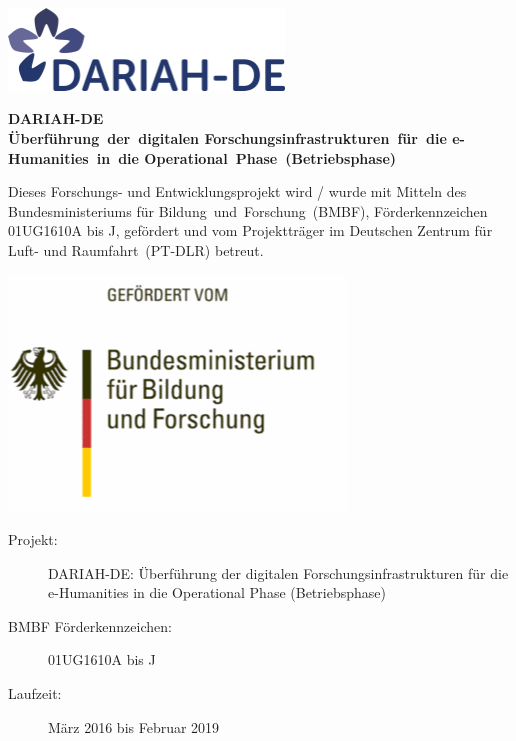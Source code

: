 \includegraphics[width=0.55\textwidth]{img/dariah-logo.png}
\vspace{20mm}
\maketitle
\vspace{5mm}
\begin{center}
\begin{LARGE}
\noindent\textbf{DARIAH-DE\\\vspace{3mm}Überführung~der~digitalen Forschungsinfrastrukturen~für~die e-Humanities~in~die Operational~Phase~(Betriebsphase)}
\end{LARGE}
\bigskip\bigskip
\vspace{10mm}

\begin{small}
\noindent Dieses Forschungs- und Entwicklungsprojekt wird / wurde mit Mitteln des Bundesministeriums für Bildung~und~Forschung~(BMBF), Förderkennzeichen 01UG1610A bis J, gefördert und vom Projektträger im Deutschen Zentrum für Luft- und Raumfahrt~(PT-DLR) betreut.\\
\end{small}
\vspace{20mm}
\includegraphics{img/bmbf.png}
\end{center}
\restoregeometry
\newpage
\normalsize
\begin{description}
\item[Projekt:] DARIAH-DE: Überführung der digitalen Forschungsinfrastrukturen für die\\e-Humanities in die Operational Phase (Betriebsphase)
\item[BMBF Förderkennzeichen:] 01UG1610A bis J
\item[Laufzeit:] März 2016 bis Februar 2019
\end{description}

